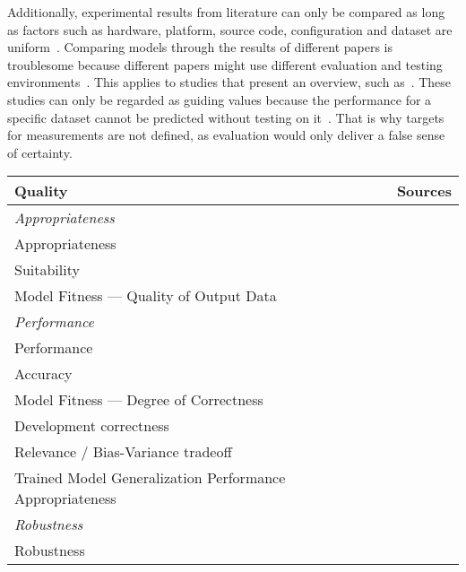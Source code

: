 Additionally, experimental results from literature can only be compared as long as factors such as
hardware, platform, source code, configuration and dataset are uniform~\citep{arpteg_software_2018}.
Comparing models through the results of different papers is troublesome because different papers
might use different evaluation and testing environments~\citep{baek_what_2019}.
This applies to studies that present an overview, such as~\cite{chen_text_2021,long_scene_2021}.
These studies can only be regarded as guiding values because the performance for a specific dataset
cannot be predicted without testing on it~\citep{arpteg_software_2018}.
That is why targets for measurements are not defined, as evaluation would only deliver a false
sense of certainty.

\begin{table}[h]
    \centering\scriptsize
    \begin{tabular}{p{} p{}}
        \textbf{Quality} & \textbf{Sources} \\
        \toprule
        \textit{Appropriateness} \\
        Appropriateness &~\cite{siebert_construction_2021} \\
        Suitability &~\cite{siebert_construction_2021} \\
        Model Fitness --- Quality of Output Data &~\cite{nakamichi_requirements-driven_2020} \\
        \midrule
        \textit{Performance} \\
        Performance &~\cite{ashmore_assuring_2021,vogelsang_requirements_2019} \\
        Accuracy &~\cite{nakamichi_requirements-driven_2020} \\
        Model Fitness --- Degree of Correctness &~\cite{nakamichi_requirements-driven_2020,
                                                    zhang_machine_2020} \\
        Development correctness &~\cite{siebert_construction_2021} \\
        Relevance / Bias-Variance tradeoff &~\cite{siebert_construction_2021, zhang_machine_2020} \\
        Trained Model Generalization Performance Appropriateness
                                                    &~\cite{nakamichi_requirements-driven_2020} \\
        \midrule
        \textit{Robustness} \\
        Robustness &~\cite{ashmore_assuring_2021, hu_towards_2020, siebert_construction_2021} \\

\end{tabular}
\end{table}
